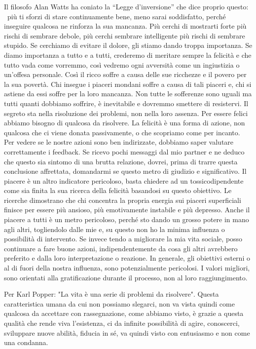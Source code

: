 \documentclass[12pt]{book} %
\begin{document}
Il filosofo Alan Watts ha coniato la “Legge d'inversione” che dice proprio questo: \ più ti sforzi
di stare continuamente bene, meno sarai soddisfatto, perché inseguire qualcosa ne rinforza la sua mancanza. Più cerchi di mostrarti forte più rischi di sembrare debole, più cerchi sembrare intelligente più rischi di sembrare stupido. Se cerchiamo di evitare il dolore, gli stiamo dando troppa importanza. Se diamo importanza a tutto e a tutti, crederemo di
meritare sempre la felicità e che tutto vada come vorremmo, così vedremo ogni avversità come un ingiustizia o
un'offesa personale. Così il ricco soffre a causa delle sue ricchezze e il povero per la sua
povertà. Chi insegue i piaceri mondani soffre a causa di tali piaceri e, chi si astiene da essi soffre per la loro
mancanza. Non tutte le sofferenze sono uguali ma tutti quanti dobbiamo soffrire, è inevitabile e dovremmo smettere di
resistervi.\newline
Il segreto sta nella risoluzione dei problemi, non nella loro assenza. Per essere felici abbiamo bisogno di qualcosa da
risolvere. La felicità è una forma di azione, non qualcosa che ci viene donata passivamente, o che scopriamo come per
incanto. Per vedere se le nostre azioni sono ben indirizzate, dobbiamo saper valutare correttamente i feedback. Se
ricevo pochi messaggi dal mio partner e ne deduco che questo sia sintomo di una brutta relazione, dovrei, prima di
trarre questa conclusione affrettata, domandarmi se questo metro di giudizio e significativo. Il piacere è un altro
indicatore pericoloso, basta chiedere ad un tossicodipendente come sia finita la sua ricerca della felicità basandosi
su questo obiettivo. Le ricerche dimostrano che chi concentra la propria energia sui piaceri superficiali finisce per
essere più ansioso, più emotivamente instabile e più depresso. Anche il piacere a tutti è un metro pericoloso, perché
sto dando un grosso potere in mano agli altri, togliendolo dalle mie e, su questo non ho la minima influenza o
possibilità di intervento. Se invece tendo a migliorare la mia vita sociale, posso continuare a fare buone azioni,
indipendentemente da cosa gli altri avrebbero preferito e dalla loro interpretazione o reazione. In generale, gli
obiettivi esterni o al di fuori della nostra influenza, sono potenzialmente pericolosi. I valori migliori, sono
orientati alla gratificazione durante il processo, non al loro raggiungimento.

Per Karl Popper: "La vita è una serie di problemi da risolvere". Questa
caratteristica umana da cui non possiamo slegarci, non va vista quindi come qualcosa da accettare con rassegnazione,
come abbiamo visto, è grazie a questa qualità che rende viva l'esistenza, ci da infinite
possibilità di agire, conoscerci, sviluppare nuove abilità, fiducia in sé, va quindi visto con entusiasmo e non come
una condanna.
\end{document}
